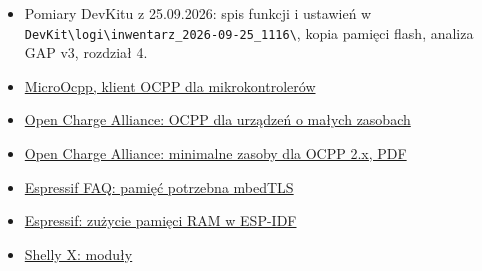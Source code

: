 \documentclass[11pt,a4paper]{article}
\begin{document}
\begin{itemize}
\item Pomiary DevKitu z 25.09.2026: spis funkcji i ustawień w \texttt{DevKit\textbackslash{}logi\textbackslash{}inwentarz\_\allowbreak{}2026-\allowbreak{}09-\allowbreak{}25\_\allowbreak{}1116\textbackslash{}}, kopia pamięci flash, analiza GAP v3, rozdział 4.
\item \href{https://github.com/matth-x/MicroOcpp}{MicroOcpp, klient OCPP dla mikrokontrolerów}
\item \href{https://openchargealliance.org/ocpp-info-whitepapers/ocpp-2-lite-ocpp-for-resource-constrained-devices/}{Open Charge Alliance: OCPP dla urządzeń o małych zasobach}
\item \href{https://openchargealliance.org/wp-content/uploads/2025/03/ocpp_2_x_minimal_footprint-v14.pdf}{Open Charge Alliance: minimalne zasoby dla OCPP 2.x, PDF}
\item \href{https://docs.espressif.com/projects/esp-faq/en/latest/software-framework/protocols/mbedtls.html}{Espressif FAQ: pamięć potrzebna mbedTLS}
\item \href{https://docs.espressif.com/projects/esp-idf/en/v4.4.6/esp32/api-guides/performance/ram-usage.html}{Espressif: zużycie pamięci RAM w ESP-IDF}
\item \href{https://x.shelly.com/modules/}{Shelly X: moduły}
\end{itemize}
\end{document}
